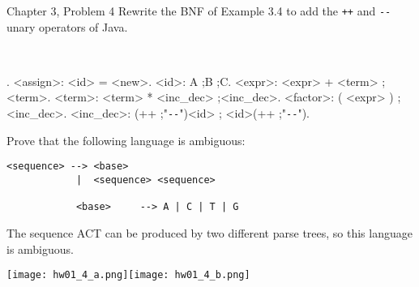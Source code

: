 \documentclass[11pt]{article}
\begin{document}
\begin{ps}
\begin{problemcit}{Chapter 3, Problem 4} Rewrite the BNF of Example 3.4 to add the \verb|++| and \verb|--| unary operators of Java.\end{problemcit}\\
\begin{soln}

  \vspace{-4ex}\mbox{}.
  <assign>: <id> = <new>.
  <id>: A ;B ;C.
  <expr>: <expr> + <term> ;<term>.
  <term>: <term> * <inc\_dec> ;<inc\_dec>.
  <factor>: ( <expr> ) ;<inc\_dec>.
  <inc\_dec>: (++ ;"\verb|--|")<id> ; <id>(++ ;"\verb|--|").
  \end{grammar}
\end{soln}
\end{ps}

\begin{ps}
\begin{problemcit}{}Prove that the following language is ambiguous:
\begin{verbatim}
<sequence> --> <base>
            |  <sequence> <sequence>

            <base>     --> A | C | T | G
\end{verbatim}
\end{problemcit}
\begin{soln}
  The sequence ACT can be produced by two different parse trees, so this language is ambiguous.

  \texttt{[image: hw01\_4\_a.png]}\texttt{[image: hw01\_4\_b.png]}

\end{soln}
\end{ps}
\end{document}
